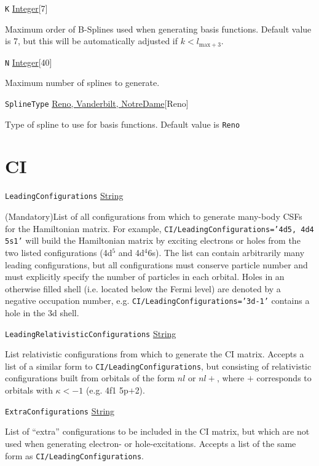 \documentclass{report}
\begin{document}
\texttt{K} \uline{Integer}[7]
\begin{adjustwidth}{1cm}{}
Maximum order of B-Splines used when generating basis functions. Default value is 7, but this will be
automatically adjusted if $k < l_{\mathrm{max} + 3}$.
\end{adjustwidth}

\texttt{N} \uline{Integer}[40]
\begin{adjustwidth}{1cm}{}
Maximum number of splines to generate.
\end{adjustwidth}

\texttt{SplineType} \uline{Reno, Vanderbilt, NotreDame}[Reno]
\begin{adjustwidth}{1cm}{}
Type of spline to use for basis functions. Default value is \texttt{Reno}
\end{adjustwidth}

\section{CI}

\texttt{LeadingConfigurations} \uline{String}
\begin{adjustwidth}{1cm}{}
(Mandatory)List of all configurations from which to generate many-body CSFs for the 
Hamiltonian matrix. For example, \texttt{CI/LeadingConfigurations='4d5, 4d4 5s1'} will build the 
Hamiltonian matrix by exciting electrons or holes from the two listed configurations (4d$^5$ and 
4d$^4$6s). The list can contain arbitrarily many leading configurations, but all configurations must 
conserve particle number and must explicitly specify the number of particles in each orbital. Holes in 
an otherwise filled shell (i.e. located below the Fermi level) are denoted by a negative occupation 
number, e.g. \texttt{CI/LeadingConfigurations='3d-1'} contains a hole in the 3d shell.
\end{adjustwidth}

\texttt{LeadingRelativisticConfigurations} \uline{String}
\begin{adjustwidth}{1cm}{}
List relativistic configurations from which to generate the CI matrix. Accepts a list of a similar form 
to \texttt{CI/LeadingConfigurations}, but consisting of relativistic configurations built from orbitals 
of the form $nl$ or $nl+$, where $+$ corresponds to orbitals with $\kappa < -1$ (e.g. 4f1 5p$+$2).
\end{adjustwidth}


\texttt{ExtraConfigurations} \uline{String}
\begin{adjustwidth}{1cm}{}
List of ``extra'' configurations to be included in the CI matrix, but which are not used when generating
electron- or hole-excitations. Accepts a list of the same form as \texttt{CI/LeadingConfigurations}.
\end{adjustwidth}
\end{document}
